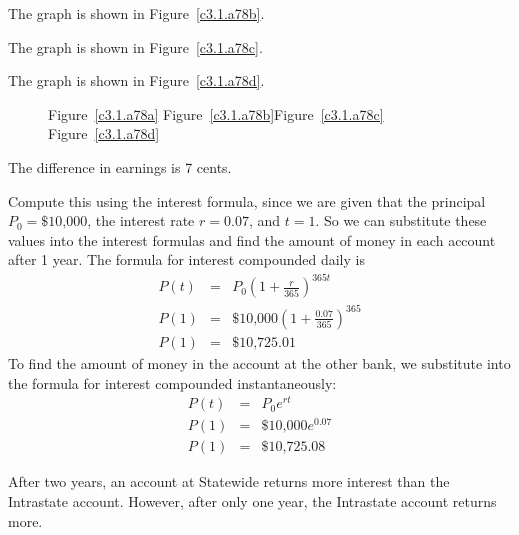 \documentclass{ximera}
\begin{document}
  The graph is shown in Figure~\ref{c3.1.a78b}.

  The graph is shown in Figure~\ref{c3.1.a78c}.

  The graph is shown in Figure~\ref{c3.1.a78d}.

\begin{figure}[htb]
                       \centerline{%
                       }
	\centerline{Figure~\ref{c3.1.a78a}\hspace{0.8in}
	Figure~\ref{c3.1.a78b}\hspace{0.8in}Figure~\ref{c3.1.a78c}
	\hspace{0.8in}Figure~\ref{c3.1.a78d}}
\end{figure}

\ans The difference in earnings is 7 cents.

\soln Compute this using the interest
formula, since we are given that the principal $P_0 = \$10\mbox{,}000$,
the interest rate $r = 0.07$, and $t = 1$.  So we can substitute
these values into the interest formulas and find the amount of money
in each account after 1 year.  The formula for interest compounded daily is
\[ \begin{array}{rcl}
P(t) & = & P_0\left(1 + \frac{r}{365}\right)^{365t} \\
P(1) & = & \$10\mbox{,}000\left(1 + \frac{0.07}{365}\right)^{365} \\
P(1) & = & \$10\mbox{,}725.01\end{array}
\]
To find the amount of money in the account at the other bank, we substitute
into the formula for interest compounded instantaneously:
\[ \begin{array}{rcl}
P(t) & = & P_0e^{rt} \\
P(1) & = & \$10\mbox{,}000e^{0.07} \\
P(1) & = & \$10\mbox{,}725.08\end{array}
\]

\ans After two years, an account at Statewide returns more interest than
the Intrastate account.  However, after only one year, the Intrastate
account returns more.
\end{document}
